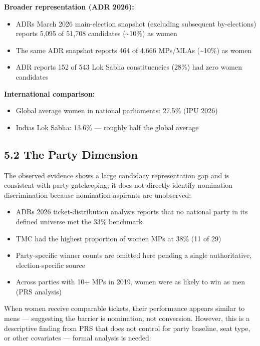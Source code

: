 \documentclass[
]{article}
\providecommand{\tightlist}{%
  \setlength{\itemsep}{0pt}\setlength{\parskip}{0pt}}
\begin{document}
\textbf{Broader representation (ADR 2026):}

\begin{itemize}
\tightlist
\item
  ADR\textquotesingle s March 2026 main-election snapshot (excluding subsequent by-elections) reports 5,095 of 51,708 candidates (\textasciitilde10\%) as women
\item
  The same ADR snapshot reports 464 of 4,666 MPs/MLAs (\textasciitilde10\%) as women
\item
  ADR reports 152 of 543 Lok Sabha constituencies (28\%) had zero women candidates
\end{itemize}

\textbf{International comparison:}

\begin{itemize}
\tightlist
\item
  Global average women in national parliaments: 27.5\% (IPU 2026)
\item
  India\textquotesingle s Lok Sabha: 13.6\% --- roughly half the global average
\end{itemize}

\subsection{5.2 The Party Dimension}\label{52-the-party-dimension}

The observed evidence shows a large candidacy representation gap and is consistent with party gatekeeping; it does not directly identify nomination discrimination because nomination aspirants are unobserved:

\begin{itemize}
\tightlist
\item
  ADR\textquotesingle s 2026 ticket-distribution analysis reports that no national party in its defined universe met the 33\% benchmark
\item
  TMC had the highest proportion of women MPs at 38\% (11 of 29)
\item
  Party-specific winner counts are omitted here pending a single authoritative, election-specific source
\item
  Across parties with 10+ MPs in 2019, women were as likely to win as men (PRS analysis)
\end{itemize}

When women receive comparable tickets, their performance appears similar to men\textquotesingle s --- suggesting the barrier is nomination, not conversion. However, this is a descriptive finding from PRS that does not control for party baseline, seat type, or other covariates --- formal analysis is needed.
\end{document}
